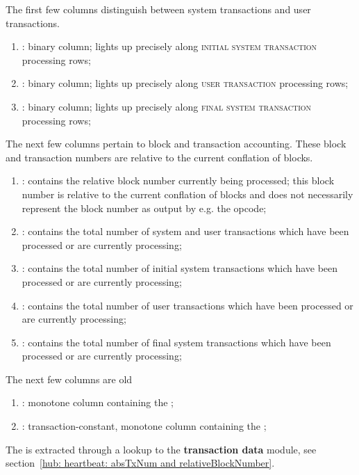 The first few columns distinguish between system transactions and user transactions.
\begin{enumerate}
	\item \sysi{}:
		binary column;
		lights up precisely along \textsc{initial system transaction} processing rows;
	\item \user{}:
		binary column;
		lights up precisely along \textsc{user transaction} processing rows;
	\item \sysf{}:
		binary column;
		lights up precisely along \textsc{final system transaction} processing rows;
\end{enumerate}
The next few columns pertain to block and transaction accounting.
These block and transaction numbers are relative to the current conflation of blocks.
\begin{enumerate}[resume]
	\item \blockNumber:
		contains the relative block number currently being processed;
		this block number is relative to the current conflation of blocks and does not necessarily represent the
		block number as output by e.g. the  opcode;
	\item \totalTransactionNumber:
		contains the total number of system and user transactions which have been processed or are currently processing;
	\item \sysiTransactionNumber:
		contains the total number of initial system transactions which have been processed or are currently processing;
	\item \userTransactionNumber:
		contains the total number of user transactions which have been processed or are currently processing;
	\item \sysfTransactionNumber:
		contains the total number of final system transactions which have been processed or are currently processing;
\end{enumerate}
The next few columns are old \specTodo{}
\begin{enumerate}[resume]
	\item \absTxNum{}: monotone column containing the \ABSTXNUM{};
	\item \relativeBlockNumber{}: transaction-constant, monotone column containing the \RELATIVEBLOCKNUMBER{};
\end{enumerate}
\saNote{} The \relativeBlockNumber{} is extracted through a lookup to the \textbf{transaction data} module, see section~\ref{hub: heartbeat: absTxNum and relativeBlockNumber}.

